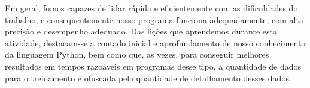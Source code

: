 \documentclass[a4paper, 12pt]{article}
\begin{document}
    Em geral, fomos capazes de lidar rápida e eficientemente com as dificuldades do trabalho, e consequentemente nosso programa funciona adequadamente, com alta precisão e desempenho adequado.
Das lições que aprendemos durante esta atividade, destacam-se a contado inicial e aprofundamento de nosso conhecimento da linguagem Python, bem como que, as vezes, para conseguir melhores resultados em tempos razoáveis em programas desse tipo, a quantidade de dados para o treinamento é ofuscada pela quantidade de detalhamento desses dados.
\end{document}
